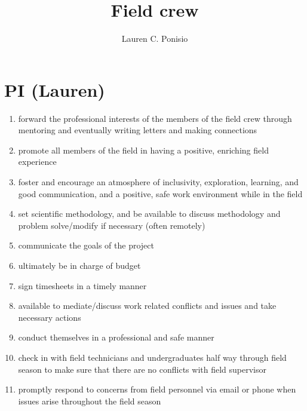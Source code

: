 \documentclass[12pt]{article}
\title{Field crew}
\author{Lauren C. Ponisio}
\begin{document}
\maketitle

\section{PI (Lauren)}
\begin{enumerate} 
\item forward the professional interests of the members of the field
  crew through mentoring and eventually writing letters and making
  connections 
\item promote all members of the field in having a positive, enriching
  field experience
\item foster and encourage an atmosphere of inclusivity, exploration,
  learning, and good communication, and a positive, safe work
  environment while in the field
\item set scientific methodology, and be available to discuss
  methodology and problem solve/modify if necessary (often remotely)
\item communicate the goals of the project
\item ultimately be in charge of budget
\item sign timesheets in a timely manner 
\item available to mediate/discuss work related conflicts and issues
  and take necessary actions
\item conduct themselves in a professional and safe manner
\item check in with field technicians and undergraduates half way through field season to make sure that there are no conflicts with field supervisor
\item promptly respond to concerns from field personnel via email or phone when issues arise throughout the field season
\end{enumerate}
\end{document}
